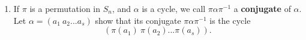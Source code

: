 \documentclass[12pt]{article}
\renewcommand\qedsymbol{$\blacksquare$}
\newenvironment{solution}
{\begin{proof}[Solution]\renewcommand\qedsymbol{$\square$}}
 {\end{proof}}
\begin{document}
\begin{enumerate}
\begin{enumerate}[label=(\alph*)]
\begin{solution}
               For $\alpha \gamma \beta$, we have $(a_1\ a_2...a_s)(a_1,b_r) $
               
               
                \end{solution}
            \end{enumerate}

        

        \item If $\pi$ is a permutation in $S_n$, and $\alpha$ is a cycle, we call $\pi \alpha \pi^{-1}$ a \textbf{conjugate} of $\alpha$. Let $\alpha = (a_1\ a_2...a_s)$ show that its conjugate $\pi \alpha \pi^{-1}$ is the cycle
        \[(\pi(a_1)\ \pi(a_2)...\pi(a_s)).\]

 \end{enumerate}
\end{document}

